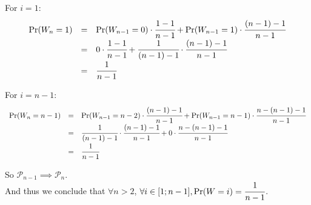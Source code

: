 \noindent
For $i = 1$:
\[\def\arraystretch{1.5}
  \begin{array}{lll}
    \Pr(W_n = 1) & = & \Pr(W_{n-1} = 0) \cdot \cfrac{1 - 1}{n - 1} + \Pr(W_{n-1} = 1) \cdot \cfrac{(n - 1) - 1}{n - 1} \\
                 & = & 0 \cdot \cfrac{1 - 1}{n - 1} + \cfrac{1}{(n - 1) - 1} \cdot \cfrac{(n - 1) - 1}{n - 1} \\
                 & = & \cfrac{1}{n - 1}
  \end{array}
\]

\noindent
For $i = n-1$:
\[\def\arraystretch{1.5}
  \begin{array}{lll}
    \Pr(W_n = n - 1) & = & \Pr(W_{n-1} = n - 2) \cdot \cfrac{(n - 1) - 1}{n - 1} + \Pr(W_{n-1} = n-1) \cdot \cfrac{n - (n-1) - 1}{n - 1} \\
                 & = & \cfrac{1}{(n - 1) - 1} \cdot \cfrac{(n - 1) - 1}{n - 1} + 0 \cdot \cfrac{n - (n-1) - 1}{n - 1} \\
                 & = & \cfrac{1}{n - 1}
  \end{array}
\]


So $\mathcal{P}_{n-1} \implies \mathcal{P}_{n}$.\\

\noindent
And thus we conclude that $\forall n > 2$, $\forall i \in [1; n-1], \Pr(W = i) = \cfrac{1}{n - 1}$.
